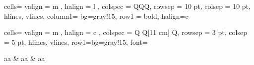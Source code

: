 \begin{table} [H] \centering
    \begin{tblr}{
        cells={ valign = m , halign = l }, colspec = {QQQ}, rowsep = 10 pt, colsep = 10 pt, hlines, vlines,
        column{1}= {bg=gray!15}, row{1} = {bold, halign=c} }

            
    \end{tblr}
    \caption{}  %
    \label{}    %
\end{table}

\begin{longtblr}[
    caption = {esto es el titulo de la tabla},
    label = {tab:etiqueta_para_referenciar}
    ]{
        cells={ valign = m , halign = c }, 
        colspec = {Q Q[11 cm] Q}, 
        rowsep = 3 pt, 
        colsep = 5 pt,           
        hlines, vlines,                             
        row{1}={bg=gray!15, font=\bfseries}
    }

        aa & aa & aa \\

\end{longtblr}

\begingroup {}
\endgroup